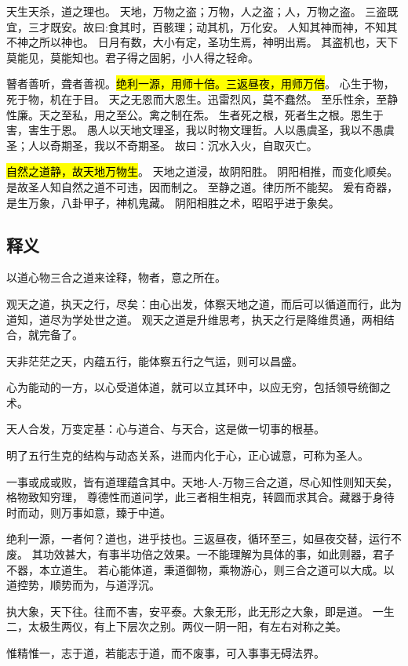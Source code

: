 天生天杀，道之理也。
天地，万物之盗；万物，人之盗；人，万物之盗。
三盗既宜，三才既安。故曰:食其时，百骸理；动其机，万化安。
人知其神而神，不知其不神之所以神也。
日月有数，大小有定，圣功生焉，神明出焉。
其盗机也，天下莫能见，莫能知也。君子得之固躬，小人得之轻命。 

瞽者善听，聋者善视。\hl{绝利一源，用师十倍。三返昼夜，用师万倍}。
心生于物，死于物，机在于目。
天之无恩而大恩生。迅雷烈风，莫不蠢然。
至乐性余，至静性廉。天之至私，用之至公。禽之制在炁。
生者死之根，死者生之根。恩生于害，害生于恩。
愚人以天地文理圣，我以时物文理哲。人以愚虞圣，我以不愚虞圣；人以奇期圣，我以不奇期圣。
故曰：沉水入火，自取灭亡。

\hl{自然之道静，故天地万物生}。
天地之道浸，故阴阳胜。
阴阳相推，而变化顺矣。是故圣人知自然之道不可违，因而制之。
至静之道。律历所不能契。
爰有奇器，是生万象，八卦甲子，神机鬼藏。
阴阳相胜之术，昭昭乎进于象矣。 

\subsection{释义}

以道心物三合之道来诠释，物者，意之所在。

观天之道，执天之行，尽矣：由心出发，体察天地之道，而后可以循道而行，此为道知，道尽为学处世之道。
观天之道是升维思考，执天之行是降维贯通，两相结合，就完备了。

天非茫茫之天，内蕴五行，能体察五行之气运，则可以昌盛。

心为能动的一方，以心受道体道，就可以立其环中，以应无穷，包括领导统御之术。

天人合发，万变定基：心与道合、与天合，这是做一切事的根基。

明了五行生克的结构与动态关系，进而内化于心，正心诚意，可称为圣人。

一事或成或败，皆有道理蕴含其中。天地-人-万物三合之道，尽心知性则知天矣，格物致知穷理，
尊德性而道问学，此三者相生相克，转圆而求其合。藏器于身待时而动，则万事如意，臻于中道。

绝利一源，一者何？道也，进乎技也。三返昼夜，循环至三，如昼夜交替，运行不废。
其功效甚大，有事半功倍之效果。一不能理解为具体的事，如此则器，君子不器，本立道生。
若心能体道，秉道御物，乘物游心，则三合之道可以大成。以道控势，顺势而为，与道浮沉。

执大象，天下往。往而不害，安平泰。大象无形，此无形之大象，即是道。
一生二，太极生两仪，有上下层次之别。两仪一阴一阳，有左右对称之美。

惟精惟一，志于道，若能志于道，而不废事，可入事事无碍法界。

